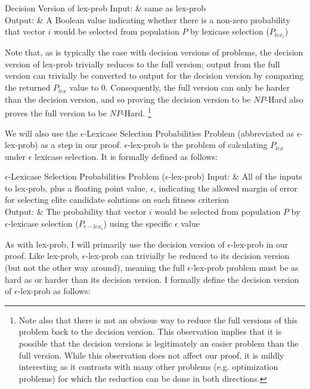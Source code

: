 \documentclass[sigconf]{acmart}
\begin{document}
\begin{problem}[ruled]{Decision Version of lex-prob}
  Input: & same as {\sc lex-prob}\\
  Output: & A Boolean value indicating whether there is a non-zero probability that vector $i$ would be selected from population $P$ by lexicase selection ($P_{lex_i}$)\\
\end{problem}

Note that, as is typically the case with decision versions of problems, the decision version of {\sc lex-prob} trivially reduces to the full version; output from the full version can trivially be converted to output for the decision version by comparing the returned $P_{lex}$ value to 0. Consequently, the full version can only be harder than the decision version, and so proving the decision version to be $NP$-Hard also proves the full version to be $NP$-Hard. \footnote{Note also that there is not an obvious way to reduce the full versions of this problem back to the decision version. This observation implies that it is possible that the decision versions is legitimately an easier problem than the full version. While this observation does not affect our proof, it is mildly interesting as it contrasts with many other problems (e.g. optimization problems) for which the reduction can be done in both directions.}

We will also use the $\epsilon$-Lexicase Selection Probabilities Problem (abbreviated as {\sc $\epsilon$-lex-prob}) as a step in our proof. {\sc $\epsilon$-lex-prob} is the problem of calculating $P_{lex}$ under $\epsilon$ lexicase selection. It is formally defined as follows:

\begin{problem}[ruled]{$\epsilon$-Lexicase Selection Probabilities Problem ($\epsilon$-lex-prob)}
  Input: & All of the inputs to {\sc lex-prob}, plus a floating point value, $\epsilon$, indicating the allowed margin of error for selecting elite candidate solutions on each fitness criterion\\
  Output: & The probability that vector $i$ would be selected from population $P$ by $\epsilon$-lexicase selection ($P_{\epsilon-lex_i}$) using the specific $\epsilon$ value\\
\end{problem}

As with {\sc lex-prob}, I will primarily use the decision version of {\sc $\epsilon$-lex-prob} in our proof. Like {\sc lex-prob}, {\sc $\epsilon$-lex-prob} can trivially be reduced to its decision version (but not the other way around), meaning the full {\sc $\epsilon$-lex-prob} problem must be as hard as or harder than its decision version. I formally define the decision version of {\sc $\epsilon$-lex-prob} as follows:
\end{document}
